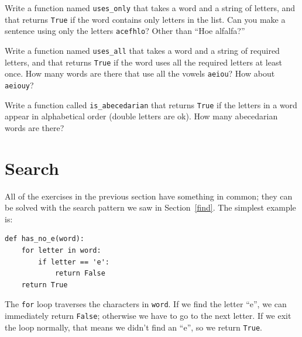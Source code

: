 \documentclass[10pt]{book}
\begin{document}
\begin{exercise}

Write a function named \verb"uses_only" that takes a word and a
string of letters, and that returns {\tt True} if the word contains
only letters in the list.  Can you make a sentence using only the
letters {\tt acefhlo}?  Other than ``Hoe alfalfa?''

\end{exercise}


\begin{exercise}

Write a function named \verb"uses_all" that takes a word and a
string of required letters, and that returns {\tt True} if the word
uses all the required letters at least once.  How many words are there
that use all the vowels {\tt aeiou}?  How about {\tt aeiouy}?

\end{exercise}


\begin{exercise}

Write a function called \verb"is_abecedarian" that returns
{\tt True} if the letters in a word appear in alphabetical order
(double letters are ok).
How many abecedarian words are there?


\end{exercise}






\section{Search}

All of the exercises in the previous section have something
in common; they can be solved with the search pattern we saw
in Section~\ref{find}.  The simplest example is:

\begin{verbatim}
def has_no_e(word):
    for letter in word:
        if letter == 'e':
            return False
    return True
\end{verbatim}
%
The {\tt for} loop traverses the characters in {\tt word}.  If we find
the letter ``e'', we can immediately return {\tt False}; otherwise we
have to go to the next letter.  If we exit the loop normally, that
means we didn't find an ``e'', so we return {\tt True}.
\end{document}

